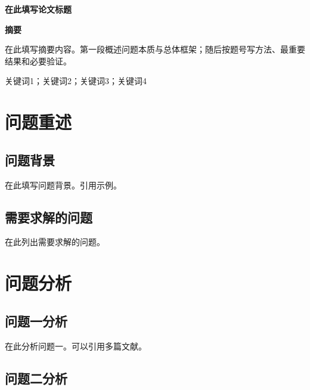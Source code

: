 \documentclass[12pt,a4paper]{article}
\newcommand{\PaperTitle}{在此填写论文标题}
\begin{document}
\setcounter{page}{1}

\thispagestyle{plain}
\begin{center}
  {\fontsize{16pt}{24pt}\selectfont\bfseries\heitifont \PaperTitle\par}
\end{center}
\begin{center}
  {\fontsize{14pt}{21pt}\selectfont\bfseries 摘\quad 要}
\end{center}\vspace{0.6cm}

在此填写摘要内容。第一段概述问题本质与总体框架；随后按题号写方法、最重要结果和必要验证。

关键词1；关键词2；关键词3；关键词4

\newpage

\section{问题重述}

\subsection{问题背景}

在此填写问题背景。引用示例\cite{Si2020}。

\subsection{需要求解的问题}

在此列出需要求解的问题。

\section{问题分析}

\subsection{问题一分析}

在此分析问题一。可以引用多篇文献\cite{Hoerl1970,Bishop2006}。

\subsection{问题二分析}
\end{document}
